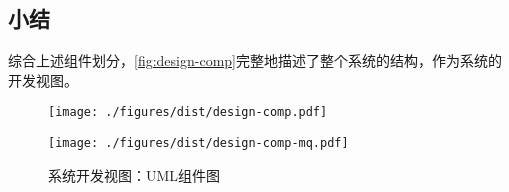 \documentclass[index]{subfiles}
\begin{document}
\subsection{小结}
综合上述组件划分，\cref{fig:design-comp}完整地描述了整个系统的结构，作为系统的开发视图。
\begin{figure}[h]
  \centering%
    {\texttt{[image: ./figures/dist/design-comp.pdf]}}\par
    {\texttt{[image: ./figures/dist/design-comp-mq.pdf]}}
  \caption{系统开发视图：UML组件图}
\end{figure}
\end{document}
